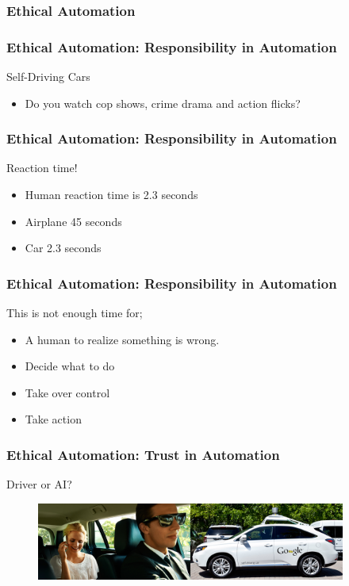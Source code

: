 \begin{frame}
  \frametitle{ Ethical Automation}
\end{frame}


\begin{frame}
  \frametitle{ Ethical Automation: Responsibility in Automation}
  {\Large Self-Driving Cars}
  \begin{itemize}
    \item Do you watch cop shows, crime drama and action flicks?
  \end{itemize}
\end{frame}

\begin{frame}
  \frametitle{ Ethical Automation: Responsibility in Automation}
  {\Large Reaction time!}
  \begin{itemize}
    \item Human reaction time is 2.3 seconds
    \item Airplane 45 seconds
    \item Car 2.3 seconds
  \end{itemize}
\end{frame}

\begin{frame}
  \frametitle{ Ethical Automation: Responsibility in Automation}
  {\Large This is not enough time for;}
  \begin{itemize}
    \item A human to realize something is wrong.
    \item Decide what to do
    \item Take over control
    \item Take action
  \end{itemize}
\end{frame}

\begin{frame}
  \frametitle{ Ethical Automation: Trust in Automation}
  {\Large Driver or AI?}
  \begin{figure}[bht]
    \centering
    \includegraphics[width=4.0in]{diagrams/car}
  \end{figure}
\end{frame}

